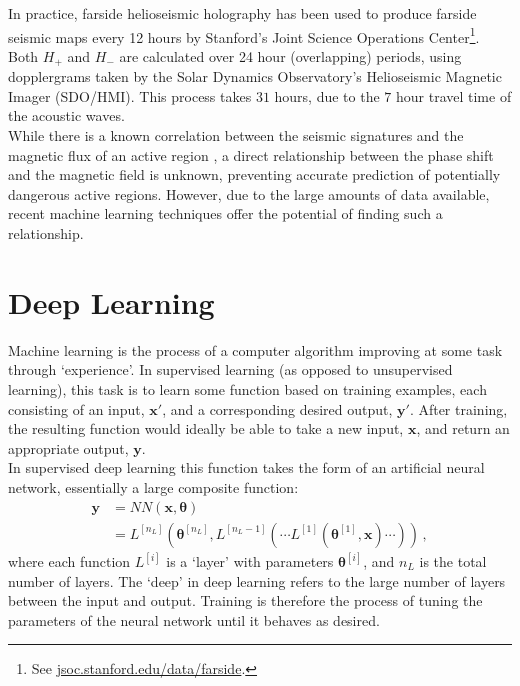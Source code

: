 \documentclass[11pt,a4paper,onecolumn]{report}
\begin{document}
In practice, farside helioseismic holography has been used to produce farside
seismic maps every 12 hours by Stanford's Joint Science Operations
Center\footnote{See \url{jsoc.stanford.edu/data/farside}.}. Both \(H_+\)
and \(H_-\) are calculated over 24 hour (overlapping) periods, using
dopplergrams taken by the Solar Dynamics Observatory's Helioseismic
Magnetic Imager (SDO/HMI). This process takes \(31 \) hours, due to the \(7\) hour
travel time of the acoustic waves. \\


While there is a known correlation between the seismic signatures and the
magnetic flux of an active region \citep{Gonzalez_Hernandez_2007}, a direct relationship
between the phase shift and the magnetic field is unknown, preventing accurate
prediction of potentially dangerous active regions. However, due to the large amounts of data
available, recent machine learning techniques offer the potential of finding
such a relationship.



%
%
\section{Deep Learning}
%
%

\label{sec: deep learning}
Machine learning is the process of a computer algorithm improving at some task
through `experience'. In supervised learning (as opposed to unsupervised
learning), this task is to learn some function based on training examples,
each consisting of an input, \(\bm{x'}\), and a corresponding desired output,
\(\bm{y'}\). After training, the resulting function would ideally be able to
take a new input, \(\bm{x}\), and return an appropriate output, \(\bm{y}\). \\

In supervised deep learning this function takes the form of an artificial neural
network, essentially a large composite function:
\begin{align}
  \bm{y} &= NN(\bm{x}, \bm{\theta})\\
  &= L^{[n_L]}(\bm{\theta}^{[n_L]}, L^{[n_L-1]}( \dotsm L^{[1]}(\bm{\theta}^{[1]}, \bm{x}) \dotsm ))\,, 
\end{align}
where each function \(L^{[i]}\) is a `layer' with parameters
\(\bm{\theta}^{[i]}\), and \(n_L\) is the total number of layers. The `deep' in deep
learning refers to the large number of layers between the input and output.
Training is therefore the process of tuning the parameters of the neural
network until it behaves as desired. \\
\end{document}
